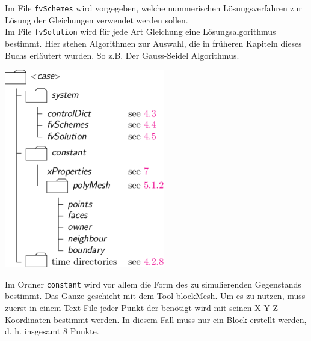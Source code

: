 \begin{refsection}
\begin{minipage}{0.5 \linewidth}
Im File  \texttt{fvSchemes} wird vorgegeben, welche nummerischen Lösungsverfahren zur Lösung der Gleichungen verwendet werden sollen.\\
Im File \texttt{fvSolution} wird für jede Art Gleichung eine Lösungsalgorithmus bestimmt.  Hier stehen Algorithmen zur Auswahl, die in früheren Kapiteln dieses Buchs erläutert wurden. So z.B. Der Gauss-Seidel Algorithmus.\\
\end{minipage}
\begin{minipage}{0.5 \linewidth}
\hspace{0.5cm}
\includegraphics[width =  \linewidth]{./OpenFOAM/Pics/Struktur.png}
\end{minipage}
\begin{minipage}{\linewidth}
 Im Ordner  \texttt{constant} wird vor allem die Form des zu simulierenden Gegenstands bestimmt. Das Ganze geschieht mit dem Tool blockMesh. Um es zu nutzen, muss zuerst in einem Text-File jeder Punkt der benötigt wird mit seinen X-Y-Z Koordinaten bestimmt werden. In diesem Fall muss nur ein Block erstellt werden, d. h. insgesamt 8 Punkte. 

\end{minipage}
\end{refsection}
